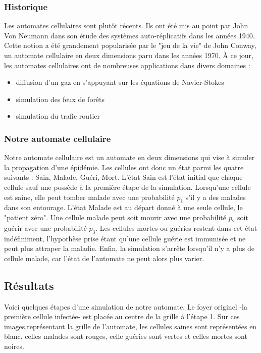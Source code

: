 \documentclass{article}
\begin{document}
\subsubsection{Historique}
	Les automates cellulaires sont plutôt récents. Ils ont été mis au point par John Von Neumann dans son étude des systèmes auto-réplicatifs dans les années 1940. Cette notion a été grandement popularisée par le "jeu de la vie" de John Conway, un automate cellulaire en deux dimensions paru dans les années 1970. À ce jour, les automates cellulaires ont de nombreuses applications dans divers domaines :
	\begin{itemize}
	\item diffusion d'un gaz en s'appuyant sur les équations de Navier-Stokes
	\item simulation des feux de forêts
	\item simulation du trafic routier
	\end{itemize}

\subsubsection{Notre automate cellulaire}
	Notre automate cellulaire est un automate en deux dimensions qui vise à simuler la propagation d'une épidémie. Les cellules ont donc un état parmi les quatre suivants : Sain, Malade, Guéri, Mort. L'état Sain est l'état initial que chaque cellule sauf une possède à la première étape de la simulation. Lorsqu'une cellule est saine, elle peut tomber malade avec une probabilité $p_1$ s'il y a des malades dans son entourage. L'état Malade est au départ donné à une seule cellule, le "patient zéro". Une cellule malade peut soit mourir avec une probabilité $p_2$ soit guérir avec une probabilité $p_3$. Les cellules mortes ou guéries restent dans cet état indéfiniment, l'hypothèse prise étant qu'une cellule guérie est immunisée et ne peut plus attraper la maladie. Enfin, la simulation s'arrête lorsqu'il n'y a plus de cellule malade, car l'état de l'automate ne peut alors plus varier.


\subsection{Résultats}

Voici quelques étapes d'une simulation de notre automate. Le foyer originel -la première cellule infectée- est placée au centre de la grille à l'étape 1. Sur ces images,représentant la grille de l'automate, les cellules saines sont représentées en blanc, celles malades sont rouges, celle guéries sont vertes et celles mortes sont noires.
\end{document}
